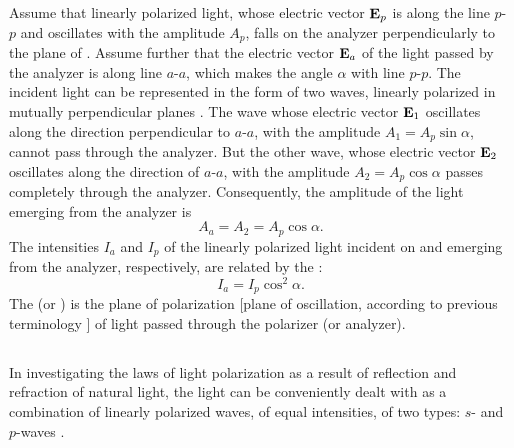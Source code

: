 Assume that linearly polarized light, whose electric vector $\vb{E}_{p}$ is along the line $p$-$p$ and oscillates with the amplitude $A_{p}$, falls on the analyzer perpendicularly to the plane of . Assume further that the electric vector $\vb{E}_{a}$ of the light passed by the analyzer is along line $a$-$a$, which makes the angle $\alpha$ with line $p$-$p$. The incident light can be represented in the form of two waves, linearly polarized in mutually perpendicular planes . The wave whose electric vector $\vb{E}_{1}$ oscillates along the direction perpendicular to $a$-$a$, with the amplitude $A_{1} = A_{p} \sin \alpha$, cannot pass through the analyzer. But the other wave, whose electric vector $\vb{E}_{2}$ oscillates along the direction of $a$-$a$, with the amplitude $A_{2} = A_{p} \cos \alpha$ passes completely through the analyzer. Consequently, the amplitude of the light emerging from the analyzer is
\begin{equation*}%
A_{a} = A_{2} = A_{p} \cos \alpha.
\end{equation*}
The intensities $I_{a}$ and $I_{p}$ of the linearly polarized light incident on and emerging from the analyzer, respectively, are related by the :
\begin{equation*}%
I_{a}= I_{p} \cos^{2} \alpha.
\end{equation*}
The  (or ) is the plane of polarization [plane of oscillation, according to previous terminology
] of light passed through the polarizer (or analyzer).

\subsection{}\label{35.1.3} In investigating the laws of light polarization as a result of reflection and refraction of natural light, the light can be conveniently dealt with as a combination of linearly polarized waves, of equal intensities, of two types: $s$- and $p$-waves .

